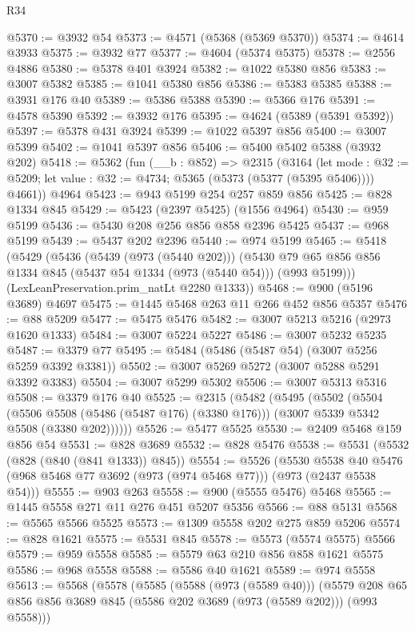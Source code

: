 \begin{lexlean}{R34}
\begin{coremodule}
@5370 := @3932 @54
@5373 := @4571 (@5368 (@5369 @5370))
@5374 := @4614 @3933
@5375 := @3932 @77
@5377 := @4604 (@5374 @5375)
@5378 := @2556 @4886
@5380 := @5378 @401 @3924
@5382 := @1022 @5380 @856
@5383 := @3007 @5382
@5385 := @1041 @5380 @856
@5386 := @5383 @5385
@5388 := @3931 @176 @40
@5389 := @5386 @5388
@5390 := @5366 @176
@5391 := @4578 @5390
@5392 := @3932 @176
@5395 := @4624 (@5389 (@5391 @5392))
@5397 := @5378 @431 @3924
@5399 := @1022 @5397 @856
@5400 := @3007 @5399
@5402 := @1041 @5397 @856
@5406 := @5400 @5402 @5388 (@3932 @202)
@5418 := @5362
    (fun (__b : @852) =>
    @2315
      (@3164
        (let mode : @32 := @5209; let value : @32 := @4734; @5365 (@5373 (@5377 (@5395 @5406))))
        @4661))
    @4964
@5423 := @943 @5199 @254 @257 @859 @856
@5425 := @828 @1334 @845
@5429 := @5423 (@2397 @5425) (@1556 @4964)
@5430 := @959 @5199
@5436 := @5430 @208 @256 @856 @858 @2396 @5425
@5437 := @968 @5199
@5439 := @5437 @202 @2396
@5440 := @974 @5199
@5465 := @5418
    (@5429
      (@5436
        (@5439 (@973 (@5440 @202)))
        (@5430 @79 @65 @856 @856 @1334 @845 (@5437 @54 @1334 (@973 (@5440 @54))) (@993 @5199)))
      (LexLeanPreservation.prim_natLt @2280 @1333))
@5468 := @900 (@5196 @3689) @4697
@5475 := @1445 @5468 @263 @11 @266 @452 @856 @5357
@5476 := @88 @5209
@5477 := @5475 @5476
@5482 := @3007 @5213 @5216 (@2973 @1620 @1333)
@5484 := @3007 @5224 @5227
@5486 := @3007 @5232 @5235
@5487 := @3379 @77
@5495 := @5484 (@5486 (@5487 @54) (@3007 @5256 @5259 @3392 @3381))
@5502 := @3007 @5269 @5272 (@3007 @5288 @5291 @3392 @3383)
@5504 := @3007 @5299 @5302
@5506 := @3007 @5313 @5316
@5508 := @3379 @176 @40
@5525 := @2315
    (@5482
      (@5495
        (@5502
          (@5504
            (@5506 @5508 (@5486 (@5487 @176) (@3380 @176)))
            (@3007 @5339 @5342 @5508 (@3380 @202))))))
@5526 := @5477 @5525
@5530 := @2409 @5468 @159 @856 @54
@5531 := @828 @3689
@5532 := @828 @5476
@5538 := @5531 (@5532 (@828 (@840 (@841 @1333)) @845))
@5554 := @5526
    (@5530 @5538 @40 @5476 (@968 @5468 @77 @3692 (@973 (@974 @5468 @77))) (@973 (@2437 @5538 @54)))
@5555 := @903 @263
@5558 := @900 (@5555 @5476) @5468
@5565 := @1445 @5558 @271 @11 @276 @451 @5207 @5356
@5566 := @88 @5131
@5568 := @5565 @5566 @5525
@5573 := @1309 @5558 @202 @275 @859 @5206
@5574 := @828 @1621
@5575 := @5531 @845
@5578 := @5573 (@5574 @5575) @5566
@5579 := @959 @5558
@5585 := @5579 @63 @210 @856 @858 @1621 @5575
@5586 := @968 @5558
@5588 := @5586 @40 @1621
@5589 := @974 @5558
@5613 := @5568
    (@5578
      (@5585
        (@5588 (@973 (@5589 @40)))
        (@5579 @208 @65 @856 @856 @3689 @845 (@5586 @202 @3689 (@973 (@5589 @202))) (@993 @5558)))

\end{coremodule}
\end{lexlean}
